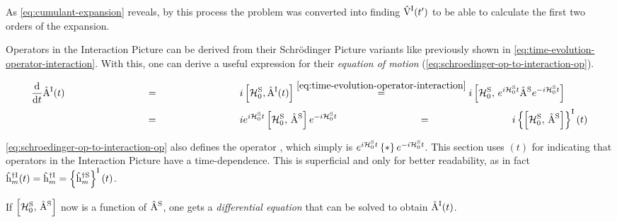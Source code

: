 As \autoref{eq:cumulant-expansion} reveals, by this process the problem was converted into finding $\VhamiltonianOf[\interactionPicture]{t'}$ to be able to calculate the first two orders of the expansion.

Operators in the Interaction Picture can be derived from their Schrödinger Picture variants like previously shown in \autoref{eq:time-evolution-operator-interaction}. 
With this, one can derive a useful expression for their \emph{equation of motion} (\autoref{eq:schroedinger-op-to-interaction-op}).

\begin{equation}
    \label{eq:schroedinger-op-to-interaction-op}
    \begin{split}
        \difft{}\AopOfT[\interactionPicture] &\stackrel{\phantom{\ref{eq:time-evolution-operator-interaction}}}{=} i \left[\HzeroHamiltonian[\schroedingerPicture], \AopOfT[\interactionPicture]\right]
        \stackrel{\ref{eq:time-evolution-operator-interaction}}{=}
        i \left[\HzeroHamiltonian[\schroedingerPicture],\,e^{i \HzeroHamiltonian[\schroedingerPicture]{} t} \Aop[\schroedingerPicture] e^{-i \HzeroHamiltonian[\schroedingerPicture]{} t}\right]\\
        &\stackrel{\phantom{\ref{eq:time-evolution-operator-interaction}}}{=}
        i e^{i \HzeroHamiltonian[\schroedingerPicture]{} t}\left[\HzeroHamiltonian[\schroedingerPicture],\, \Aop[\schroedingerPicture]\right]e^{-i \HzeroHamiltonian[\schroedingerPicture]{} t}
        \stackrel{\phantom{\ref{eq:time-evolution-operator-interaction}}}{=}
        i \interactionTimeEvolution{\left[\HzeroHamiltonian[\schroedingerPicture],\, \Aop[\schroedingerPicture]\right]}
    \end{split}
\end{equation}

\autoref{eq:schroedinger-op-to-interaction-op} also defines the operator \interactionTimeEvolution{\ast}, which simply is $e^{i \HzeroHamiltonian[\schroedingerPicture]{} t} \left\{\ast \right\} e^{-i \HzeroHamiltonian[\schroedingerPicture]{} t}$.
This section uses $(t)$ for indicating that operators in the Interaction Picture have a time-dependence. 
This is superficial and only for better readability, as in fact $\hopOfT[\interactionPicture]{m}{\dagger} = \hop[\interactionPicture]{m}{\dagger} = \interactionTimeEvolution{\hop[\schroedingerPicture]{m}{\dagger}}$.

If $\left[\HzeroHamiltonian[\schroedingerPicture],\, \Aop[\schroedingerPicture]\right]$ now is a function of $\Aop[\schroedingerPicture]$, one gets a \emph{differential equation} that can be solved to obtain $\AopOfT[\interactionPicture]$.

